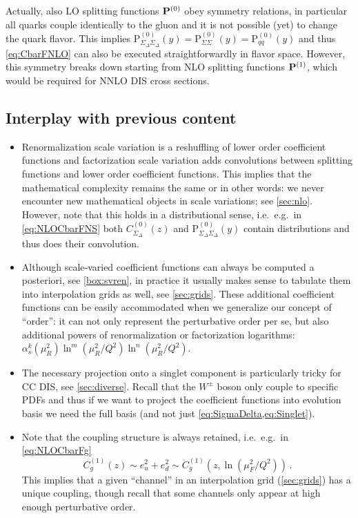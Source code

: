 Actually, also LO splitting functions $\vb P^{(0)}$ obey symmetry relations, in particular all quarks couple identically to the gluon and it is not possible (yet) to change the quark flavor.
This implies $\mathrm P_{\Sigma_\Delta \Sigma_\Delta}^{(0)}(y) = \mathrm P_{\Sigma \Sigma}^{(0)}(y) = \mathrm P_{qq}^{(0)}(y)$ and thus \cref{eq:CbarFNLO} can also be executed straightforwardly in flavor space.
However, this symmetry breaks down starting from NLO splitting functions $\vb P^{(1)}$, which would be required for NNLO DIS cross sections.

\subsection{Interplay with previous content}

\begin{itemize}
    \item Renormalization scale variation is a reshuffling of lower order coefficient functions and factorization scale variation adds convolutions between splitting functions and lower order coefficient functions.
        This implies that the mathematical complexity remains the same or in other words: we never encounter new mathematical objects in scale variations; see \cref{sec:nlo}.
        However, note that this holds in a distributional sense, i.e.\ e.g.\ in \cref{eq:NLOCbarFNS} both $C^{(0)}_{\Sigma_\Delta}(z)$ and $\mathrm P_{\Sigma_\Delta \Sigma_\Delta}^{(0)}(y)$ contain distributions and thus does their convolution.
    \item Although scale-varied coefficient functions can always be computed a posteriori, see \cref{box:svren}, in practice it usually makes sense to tabulate them into interpolation grids as well, see \cref{sec:grids}.
        These additional coefficient functions can be easily accommodated when we generalize our concept of \enquote{order}: it can not only represent the perturbative order per se, but also additional powers of renormalization or factorization logarithms: $\alpha_s^k(\mu_R^2)\ln^m(\mu_R^2/Q^2)\ln^n(\mu_R^2/Q^2)$.
    \item The necessary projection onto a singlet component is particularly tricky for CC DIS, see \cref{sec:diverse}.
        Recall that the $W^\pm$ boson only couple to specific PDFs and thus if we want to project the coefficient functions into evolution basis we need the full basis (and not just \cref{eq:SigmaDelta,eq:Singlet}).
    \item Note that the coupling structure is always retained, i.e.\ e.g.\ in \cref{eq:NLOCbarFg}
        \begin{equation}
            C^{(1)}_{g}(z) \sim e_u^2 + e_d^2 \sim C^{(1)}_{g}(z,\ln(\mu_F^2/Q^2))\,.
        \end{equation}
        This implies that a given \enquote{channel} in an interpolation grid (\cref{sec:grids}) has a unique coupling, though recall that some channels only appear at high enough perturbative order.
\end{itemize}
